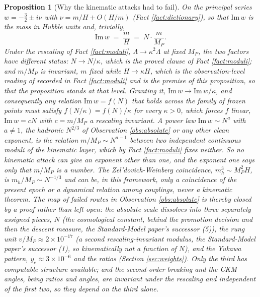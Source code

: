 \documentclass[11pt]{article}
\newtheorem{proposition}[theorem]{Proposition}
\theoremstyle{definition}
\begin{document}
\begin{proposition}[Why the kinematic attacks had to fail]\label{prop:covariance}
On the principal series $w = -\tfrac32 \pm i\nu$ with $\nu = m/H + O(H/m)$ (Fact \ref{fact:dictionary}), so that $\mathrm{Im}\,w$ is the mass in Hubble units and, trivially,
\[
\mathrm{Im}\,w \;=\; \frac{m}{H} \;=\; N \cdot \frac{m}{M_{P}} .
\]
Under the rescaling of Fact \ref{fact:moduli}, $\Lambda \to \kappa^{2}\Lambda$ at fixed $M_{P}$, the two factors have different status: $N \to N/\kappa$, which is the proved clause of Fact \ref{fact:moduli}; and $m/M_{P}$ is invariant, $m$ fixed while $H \to \kappa H$, which is the observation-level reading of \cite[Prop.~7.6(1)]{ButlerT12} recorded in Fact \ref{fact:moduli} and is the premise of this proposition, so that the proposition stands at that level. Granting it, $\mathrm{Im}\,w \to \mathrm{Im}\,w/\kappa$, and consequently any relation $\mathrm{Im}\,w = f(N)$ that holds across the family of frozen points must satisfy $f(N/\kappa) = f(N)/\kappa$ for every $\kappa > 0$, which forces $f$ linear, $\mathrm{Im}\,w = cN$ with $c = m/M_{P}$ a rescaling invariant. A power law $\mathrm{Im}\,w \sim N^{a}$ with $a \neq 1$, the hadronic $N^{2/3}$ of Observation \ref{obs:absolute} or any other clean exponent, is the relation $m/M_{P} \sim N^{a - 1}$ between two independent continuous moduli of the kinematic layer, which by Fact \ref{fact:moduli} fixes neither. So no kinematic attack can give an exponent other than one, and the exponent one says only that $m/M_{P}$ is a number. The Zel'dovich-Weinberg coincidence, $m_{h}^{3} \sim M_{P}^{2}H$, is $m_{h}/M_{P} \sim N^{-1/3}$ and can be, in this framework, only a coincidence of the present epoch or a dynamical relation among couplings, never a kinematic theorem. The map of failed routes in Observation \ref{obs:absolute} is thereby closed by a proof rather than left open: the absolute scale dissolves into three separately assigned pieces, $N$ (the cosmological constant, behind the promotion decision and then the descent measure, the Standard-Model paper's successor (5)), the rung unit $v/M_{P} \approx 2 \times 10^{-17}$ (a second rescaling-invariant modulus, the Standard-Model paper's successor (1), so kinematically not a function of $N$), and the Yukawa pattern, $y_{e} \approx 3 \times 10^{-6}$ and the ratios (Section \ref{sec:weights}). Only the third has computable structure available; and the second-order breaking and the CKM angles, being ratios and angles, are invariant under the rescaling and independent of the first two, so they depend on the third alone.
\end{proposition}
\end{document}
